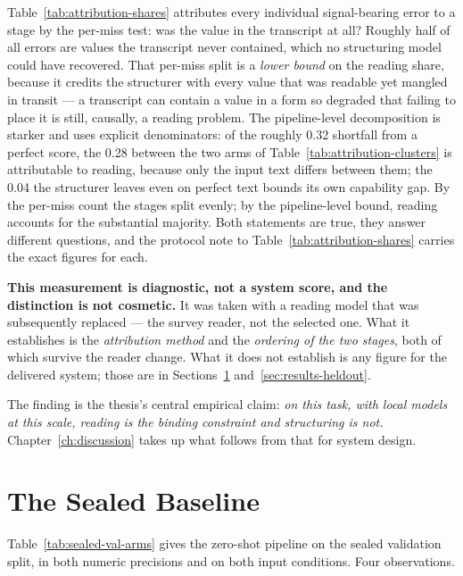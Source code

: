 Table~\ref{tab:attribution-shares} attributes every individual signal-bearing error to a stage
by the per-miss test: was the value in the transcript at all? Roughly half of all errors are
values the transcript never contained, which no structuring model could have recovered. That
per-miss split is a \emph{lower bound} on the reading share, because it credits the structurer
with every value that was readable yet mangled in transit --- a transcript can contain a value
in a form so degraded that failing to place it is still, causally, a reading problem. The
pipeline-level decomposition is starker and uses explicit denominators: of the roughly 0.32
shortfall from a perfect score, the 0.28 between the two arms of
Table~\ref{tab:attribution-clusters} is attributable to reading, because only the input text
differs between them; the 0.04 the structurer leaves even on perfect text bounds its own
capability gap. By the per-miss count the stages split evenly; by the pipeline-level bound,
reading accounts for the substantial majority. Both statements are true, they answer different
questions, and the protocol note to Table~\ref{tab:attribution-shares} carries the exact
figures for each.



\textbf{This measurement is diagnostic, not a system score, and the distinction is not
cosmetic.} It was taken with a reading model that was subsequently replaced --- the survey
reader, not the selected one. What it establishes is the \emph{attribution method} and the
\emph{ordering of the two stages}, both of which survive the reader change. What it does not
establish is any figure for the delivered system; those are in
Sections~\ref{sec:results-baseline} and~\ref{sec:results-heldout}.

The finding is the thesis's central empirical claim: \emph{on this task, with local models at
this scale, reading is the binding constraint and structuring is not.} Chapter~\ref{ch:discussion}
takes up what follows from that for system design.

\section{The Sealed Baseline}
\label{sec:results-baseline}

Table~\ref{tab:sealed-val-arms} gives the zero-shot pipeline on the sealed validation split, in
both numeric precisions and on both input conditions. Four observations.


